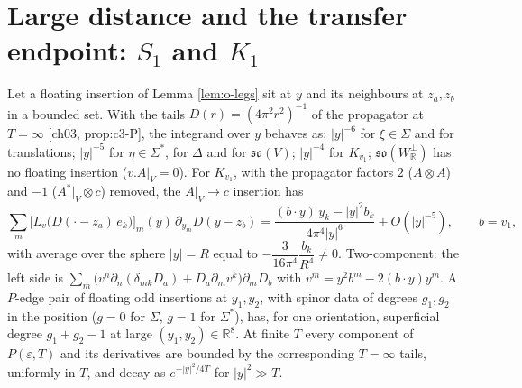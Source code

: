 \section{Large distance and the transfer endpoint: $S_1$ and $K_1$}

\begin{proposition}
\label{prop:o-ir}
Let a floating insertion of Lemma \ref{lem:o-legs} sit at $y$ and its neighbours at $z_a,z_b$ in a bounded set. With the tails $D(r)=(4\pi^2r^2)^{-1}$ of the propagator at $T=\infty$ [ch03, prop:c3-P], the integrand over $y$ behaves as: $|y|^{-6}$ for $\xi\in\Sigma$ and for translations; $|y|^{-5}$ for $\eta\in\Sigma^*$, for $\Delta$ and for $\mathfrak{so}(V)$; $|y|^{-4}$ for $K_{v_1}$; $\mathfrak{so}(W_{\mathbb R}^\perp)$ has no floating insertion ($v.A|_V=0$). For $K_{v_1}$, with the propagator factors $2$ ($A\otimes A$) and $-1$ ($A^*|_V\otimes c$) removed, the $A|_V\to c$ insertion has
\begin{equation}
\sum_m\big[L_v\big(D(\cdot-z_a)\,e_k\big)\big]_m(y)\,\partial_{y_m}D(y-z_b)=\frac{(b\cdot y)\,y_k-|y|^2b_k}{4\pi^4|y|^6}+O(|y|^{-5}),\qquad b=v_1,
\label{eq:o-Kir}
\end{equation}
with average over the sphere $|y|=R$ equal to $-\dfrac{3}{16\pi^4}\dfrac{b_k}{R^4}\neq0$. Two-component: the left side is $\sum_m\big(v^n\partial_n(\delta_{mk}D_a)+D_a\partial_mv^k\big)\partial_mD_b$ with $v^m=y^2b^m-2(b\cdot y)y^m$. A $P$-edge pair of floating odd insertions at $y_1,y_2$, with spinor data of degrees $g_1,g_2$ in the position ($g=0$ for $\Sigma$, $g=1$ for $\Sigma^*$), has, for one orientation, superficial degree $g_1+g_2-1$ at large $(y_1,y_2)\in\mathbb R^8$. At finite $T$ every component of $P(\varepsilon,T)$ and its derivatives are bounded by the corresponding $T=\infty$ tails, uniformly in $T$, and decay as $e^{-|y|^2/4T}$ for $|y|^2\gg T$.
\end{proposition}

